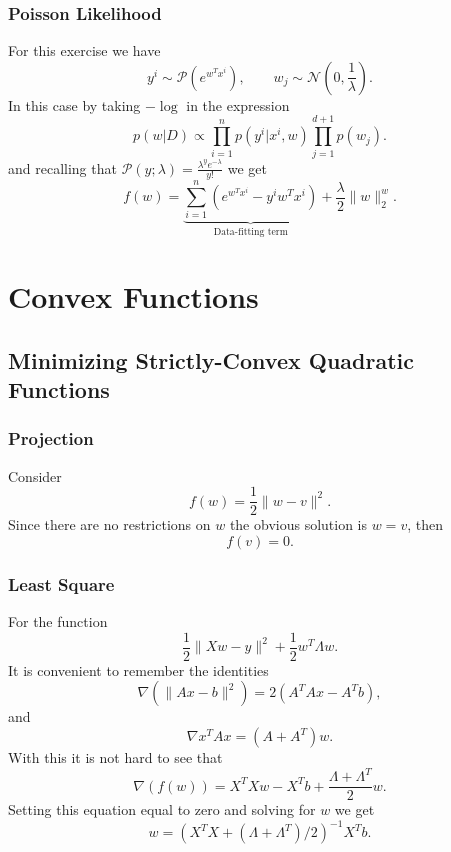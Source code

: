 \documentclass[11pt]{article}
\theoremstyle{plain}
\begin{document}
\subsubsection{Poisson Likelihood}
For this exercise we have
\begin{equation*}
y^{i}\sim\mathcal{P}(e^{w^{T}x^{i}}),\qquad w_{j}\sim\mathcal{N}(0,\frac{1}{\lambda}).
\end{equation*}
In this case by taking $-\log$ in the expression
\begin{equation*}
p(w|D)\propto\prod_{i=1}^{n}p(y^{i}|x^{i},w)\prod_{j=1}^{d+1}p(w_{j}).
\end{equation*}
and recalling that $\mathcal{P}(y;\lambda)=\frac{\lambda^{y}e^{-\lambda}}{y!}$ we get
\begin{equation*}
f(w)=\underbrace{\sum_{i=1}^{n}(e^{w^{T}x^{i}}-y^{i}w^{T}x^{i})}_{\text{Data-fitting term}}+
\frac{\lambda}{2}\|w\|_{2}^{w}.
\end{equation*}
\newpage
\section{Convex Functions}

\subsection{Minimizing Strictly-Convex Quadratic Functions}

\subsubsection{Projection}
Consider
\begin{equation*}
f(w)=\frac{1}{2}\|w-v\|^{2}.
\end{equation*}
Since there are no restrictions on $w$ the obvious solution is $w=v$, then
\begin{equation*}
f(v)=0.
\end{equation*}

\subsubsection{Least Square}
For the function
\begin{equation*}
\frac{1}{2}\|Xw-y\|^{2}+\frac{1}{2}w^{T}\Lambda w.
\end{equation*}
It is convenient to remember the identities 
\begin{equation}\label{eqnnicenorm}
\nabla(\|Ax-b\|^{2})=2(A^{T}Ax-A^{T}b),
\end{equation}
and
\begin{equation*}
\nabla x^{T}Ax=(A+A^{T})w.
\end{equation*}
With this it is not hard to see that
\begin{equation*}
\nabla(f(w))=X^{T}Xw-X^{T}b+\frac{\Lambda+\Lambda^{T}}{2}w.
\end{equation*}
Setting this equation equal to zero and solving for $w$ we get
\begin{equation*}
w=\left(X^{T}X+(\Lambda+\Lambda^{T})/2\right)^{-1}X^{T}b.
\end{equation*}
\end{document}
